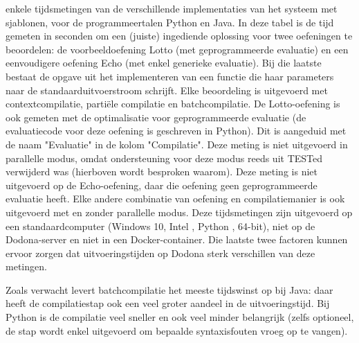  enkele tijdsmetingen van de verschillende implementaties van het systeem met sjablonen, voor de programmeertalen Python en Java.
In deze tabel is de tijd gemeten in seconden om een (juiste) ingediende oplossing voor twee oefeningen te beoordelen: de voorbeeldoefening Lotto (met geprogrammeerde evaluatie) en een eenvoudigere oefening Echo (met enkel generieke evaluatie).
Bij die laatste bestaat de opgave uit het implementeren van een functie die haar parameters naar de standaarduitvoerstroom schrijft.
Elke beoordeling is uitgevoerd met contextcompilatie, partiële compilatie en batchcompilatie.
De Lotto-oefening is ook gemeten met de optimalisatie voor geprogrammeerde evaluatie (de evaluatiecode voor deze oefening is geschreven in Python).
Dit is aangeduid met de naam "Evaluatie" in de kolom "Compilatie".
Deze meting is niet uitgevoerd in parallelle modus, omdat ondersteuning voor deze modus reeds uit TESTed verwijderd was (hierboven wordt besproken waarom).
Deze meting is niet uitgevoerd op de Echo-oefening, daar die oefening geen geprogrammeerde evaluatie heeft.
Elke andere combinatie van oefening en compilatiemanier is ook uitgevoerd met en zonder parallelle modus.
Deze tijdsmetingen zijn uitgevoerd op een standaardcomputer (Windows 10, Intel , Python , 64-bit), niet op de Dodona-server en niet in een Docker-container.
Die laatste twee factoren kunnen ervoor zorgen dat uitvoeringstijden op Dodona sterk verschillen van deze metingen.

Zoals verwacht levert batchcompilatie het meeste tijdswinst op bij Java: daar heeft de compilatiestap ook een veel groter aandeel in de uitvoeringstijd.
Bij Python is de compilatie veel sneller en ook veel minder belangrijk (zelfs optioneel, de stap wordt enkel uitgevoerd om bepaalde syntaxisfouten vroeg op te vangen).

